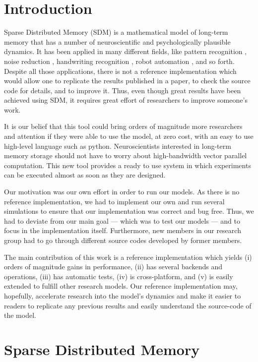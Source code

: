 \chapter{Introduction}

Sparse Distributed Memory (SDM) \citep{Kanerva1988} is a mathematical model of long-term memory that has a number of neuroscientific and psychologically plausible dynamics. It has been applied in many different fields, like pattern recognition \citep{norman2003modeling, rao1995natural}, noise reduction \citep{Meng2009}, handwriting recognition \citep{fan1997genetic}, robot automation \citep{Rajesh1998, mendes2008robot}, and so forth. Despite all those applications, there is not a reference implementation which would allow one to replicate the results published in a paper, to check the source code for details, and to improve it. Thus, even though great results have been achieved using SDM, it requires great effort of researchers to improve someone's work.

It is our belief that this tool could bring orders of magnitude more researchers and attention if they were able to use the model, at zero cost, with an easy to use high-level language such as python. Neuroscientists interested in long-term memory storage should not have to worry about high-bandwidth vector parallel computation.  This new tool provides a ready to use system in which experiments can be executed almost as soon as they are designed.  

Our motivation was our own effort in order to run our models. As there is no reference implementation, we had to implement our own and run several simulations to ensure that our implementation was correct and bug free. Thus, we had to deviate from our main goal --- which was to test our models --- and to focus in the implementation itself. Furthermore, new members in our research group had to go through different source codes developed by former members.

The main contribution of this work is a reference implementation which yields (i) orders of magnitude gains in performance, (ii) has several backends and operations, (iii) has automatic tests, (iv) is cross-platform, and (v) is easily extended to fulfill other research models. Our reference implementation may, hopefully, accelerate research into the model's dynamics and make it easier to readers to replicate any previous results and easily understand the source-code of the model.  


\chapter{Sparse Distributed Memory}

